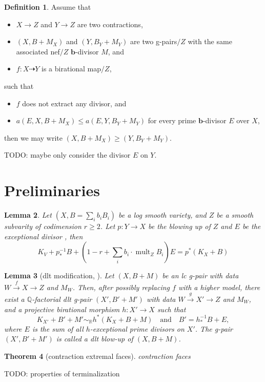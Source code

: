 \documentclass[11pt]{amsart}
\numberwithin{equation}{section}
\newcommand{\bb}{\bm{b}}
\newtheorem{thm}{Theorem}[section]
\newtheorem{lem}[thm]{Lemma}
\theoremstyle{definition}
\newtheorem{defn}[thm]{Definition}
\theoremstyle{definition}
\theoremstyle{definition}
\begin{document}
\begin{defn}
Assume that
\begin{itemize}
    \item $X\rightarrow Z$ and $Y\rightarrow Z$ are two contractions,
    \item $(X,B+M_X)$ and $(Y,B_Y+M_Y)$ are two g-pairs$/Z$ with the same associated nef$/Z$ $\bb$-divisor $M$, and
    \item $f: X\dashrightarrow Y$ is a birational map$/Z$,
\end{itemize}
such that
\begin{itemize}
    \item $f$ does not extract any divisor, and
    \item $a(E,X,B+M_X)\leq a(E,Y,B_Y+M_Y)$ for every prime $\bb$-divisor $E$ over $X$,
\end{itemize}
then we may write $(X,B+M_X)\geq (Y,B_Y+M_Y)$.
\end{defn}

TODO: maybe only consider the divisor $E$ on $Y$.  

\section{Preliminaries}
\begin{lem}
Let $(X,B= \sum_{i}b_{i}B_{i})$ be a log smooth variety, and $Z$ be a smooth subvarity of codimension $r \geqslant 2$. Let $p:Y \to X$ be the blowing up of $Z$ and $E$ be the exceptional divisor , then 
  \[
  K_{V}+p^{-1}_*B +(1-r+ \sum_{i}b_{i}\cdot \operatorname{mult}_ZB_{i}) E= p^*(K_{X}+B)
  \]
  
\end{lem}
	\begin{lem}[dlt modification, {\cite[Proposition 3.10]{HL22}}]\label{lem: dlt modification}
		Let $ (X,B+M) $ be an lc g-pair with data $ W \xrightarrow{f} X \to Z $ and $ M_W $. Then, after possibly replacing $ f $ with a higher model, there exist a $\mathbb{Q}$-factorial dlt g-pair $(X',B'+M')$ with data $ W \xrightarrow{g}  X' \to Z $ and $ M_W $, and a projective birational morphism $ h \colon X' \to X $ such that 
		\[ K_{X'} + B' + M' \sim_\mathbb{R} h^* (K_X + B + M) \quad \text{and} \quad B' = h_*^{-1} B + E , \]
		where $ E $ is the sum of all $ h $-exceptional prime divisors on $ X' $. The g-pair $(X',B'+M')$ is called a \emph{dlt blow-up} of $(X,B+M)$.
	\end{lem}

\begin{thm}[contraction extremal faces]\label{thm: contraction extremal face glc}
  contraction faces
\end{thm}
TODO: properties of terminalization
\end{document}
